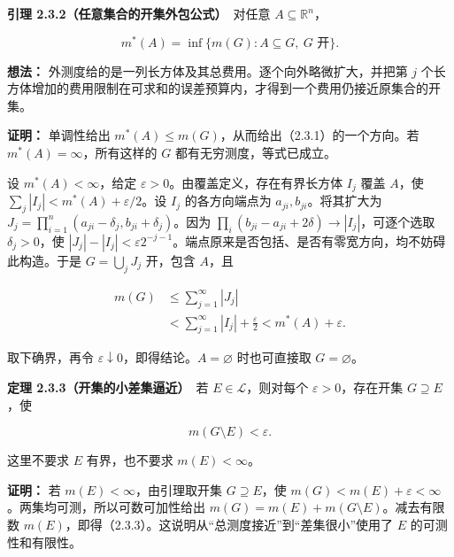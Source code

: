 \documentclass[11pt,a4paper]{article}
\begin{document}
\textbf{引理 2.3.2（任意集合的开集外包公式）}　对任意
\(A\subseteq\mathbb R^n\)，

\begin{equation*}
m^*(A)=\inf\{m(G):A\subseteq G,\ G\text{ 开}\}.
\tag{2.3.1}
\end{equation*}

\textbf{想法：}
外测度给的是一列长方体及其总费用。逐个向外略微扩大，并把第 \(j\)
个长方体增加的费用限制在可求和的误差预算内，才得到一个费用仍接近原集合的开集。

\textbf{证明：} 单调性给出
\(m^*(A)\le m(G)\)，从而给出（2.3.1）的一个方向。若
\(m^*(A)=\infty\)，所有这样的 \(G\) 都有无穷测度，等式已成立。

设 \(m^*(A)<\infty\)，给定 \(\varepsilon>0\)。由覆盖定义，存在有界长方体
\(I_j\) 覆盖 \(A\)，使 \(\sum_j|I_j|<m^*(A)+\varepsilon/2\)。设 \(I_j\)
的各方向端点为 \(a_{ji},b_{ji}\)。将其扩大为
\(J_j=\prod_{i=1}^n(a_{ji}-\delta_j,b_{ji}+\delta_j)\)。因为
\(\prod_i(b_{ji}-a_{ji}+2\delta)\to|I_j|\)，可逐个选取
\(\delta_j>0\)，使
\(|J_j|-|I_j|<\varepsilon2^{-j-1}\)。端点原来是否包括、是否有零宽方向，均不妨碍此构造。于是
\(G=\bigcup_jJ_j\) 开，包含 \(A\)，且

\begin{equation*}
\begin{aligned}
m(G)&\le\sum_{j=1}^{\infty}|J_j|\\
&<\sum_{j=1}^{\infty}|I_j|+\frac{\varepsilon}{2}
<m^*(A)+\varepsilon.
\end{aligned}
\tag{2.3.2}
\end{equation*}

取下确界，再令 \(\varepsilon\downarrow0\)，即得结论。\(A=\varnothing\)
时也可直接取 \(G=\varnothing\)。

\textbf{定理 2.3.3（开集的小差集逼近）}　若 \(E\in\mathcal L\)，则对每个
\(\varepsilon>0\)，存在开集 \(G\supseteq E\)，使

\begin{equation*}
m(G\setminus E)<\varepsilon.
\tag{2.3.3}
\end{equation*}

这里不要求 \(E\) 有界，也不要求 \(m(E)<\infty\)。

\textbf{证明：} 若 \(m(E)<\infty\)，由引理取开集 \(G\supseteq E\)，使
\(m(G)<m(E)+\varepsilon<\infty\)。两集均可测，所以可数可加性给出
\(m(G)=m(E)+m(G\setminus E)\)。减去有限数
\(m(E)\)，即得（2.3.3）。这说明从``总测度接近''到``差集很小''使用了
\(E\) 的可测性和有限性。
\end{document}
